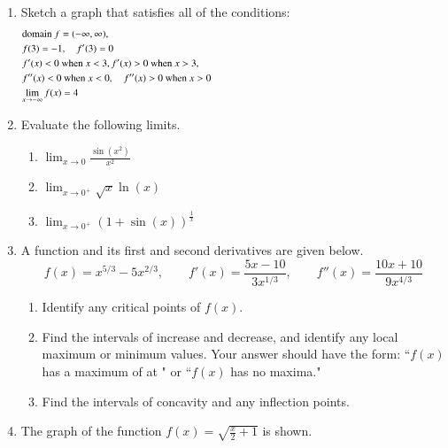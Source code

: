 \documentclass[12pt]{article}
\begin{document}
\begin{enumerate}
\item Sketch a graph that satisfies all of the conditions:
\begin{align*}
  &\text{domain } f = (-\infty,\infty), \hspace{5.0in}\\
  &f(3)=-1, \quad f'(3)=0  \\
  & f'(x)<0 \text{ when } x<3,f'(x)>0 \text{ when } x > 3,  \\
  &f''(x)<0 \text{ when } x<0, \quad f''(x)>0 \text{ when } x>0 \\
  &\displaystyle{\lim_{x \to -\infty} f(x)=4}\\
\end{align*}

\item Evaluate the following limits.
\begin{enumerate}
\item $\lim_{x \to 0} \frac{\sin(x^2)}{x^2}$
\item $\lim_{x \to 0^+} \sqrt{x} \ln(x)$
\item $\lim_{x \to 0^+} \left(1+\sin(x) \right)^{\frac{1}{x}}$
\end{enumerate}

\item A function and its first and second derivatives are given below.
$$f(x)=x^{5/3}-5x^{2/3}, \quad \quad f'(x)=\frac{5x-10}{3x^{1/3}}, \quad \quad f''(x)=\frac{10x+10}{9x^{4/3}}$$
\begin{enumerate}
\item Identify any critical points of $f(x).$
\item Find the intervals of increase and decrease, and identify any local maximum or minimum values. Your answer should have the form: ``$f(x)$ has a maximum of \underline{\hspace{.3in}}  at \underline{\hspace{.3in}}" or ``$f(x)$ has no maxima."
\item Find the intervals of concavity and any inflection points.
\end{enumerate}

\item The graph of the function $\displaystyle f(x) = \sqrt{\frac{x}{2}+1}$ is shown.



\end{enumerate}
\end{document}
